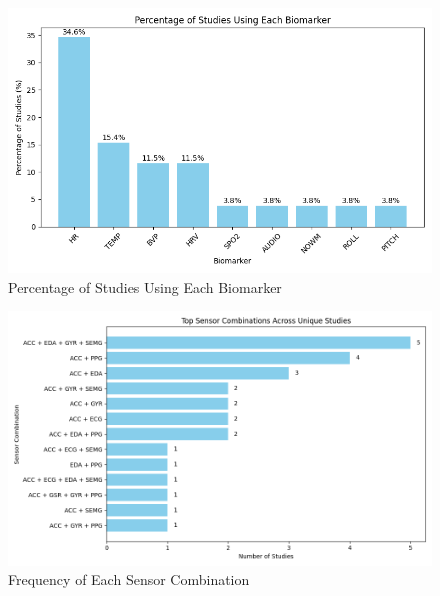\begin{figure}
    \centering
    \includegraphics[width=1\textwidth]{Results/figures/percentage_of_studies_using_each_biomarker.png}
    \caption{Percentage of Studies Using Each Biomarker}
    \label{fig:percentage_of_studies_using_each_biomarker}
\end{figure}

\begin{figure}
    \centering
    \includegraphics[width=1\textwidth]{Results/figures/freq_of_each_sensor_comp.png}
    \caption{Frequency of Each Sensor Combination}
    \label{fig:freq_of_each_sensor_comp}
\end{figure}

